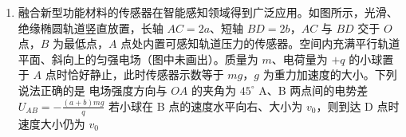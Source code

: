 \documentclass[\gkver]{gaokaozhenti}
\begin{document}
\begin{enumerate}
{可得波长 $\lambda = 4\Um$，故 B 正确；

A．结合 B 项分析可知 $x_{OM} = \frac{1}{2}\lambda = 2\Um$

所以该波的波速 $v = \frac{x_{OM}}{t} = 0.5\Ums$，故 A 错误；

C．从题图示状态经过 $2\Us$，则波沿 $x$ 轴正方向传播了 $\Delta x = 1\Um = \frac{\lambda}{4}$，故 $M$ 从平衡位置运动到了波峰位置，速度为 $0$，$N$ 从波谷位置运动到了平衡位置，速度最大，显然两点速度不同，故 C 错误；

D．该波的周期 $T = \frac{\lambda}{v} = 8\Us$

从图示时刻计时，$M$ 的振动方程为 $y_{M} = A\sin\frac{\pi}{4}t$

$N$ 的振动方程为 $y_{N} = A\sin\left(\frac{\pi}{4}t - \frac{\pi}{2}\right)$

经 $t = 3\Us$ 后，$y_{M} = y_{N} = \frac{\sqrt{2}}{2}A$，故 D 正确。

故选 BD。
}

\item
融合新型功能材料的传感器在智能感知领域得到广泛应用。如图所示，光滑、绝缘椭圆轨道竖直放置，长轴 $AC = 2a$、短轴 $BD = 2b$，$AC$ 与 $BD$ 交于 $O$ 点，$B$ 为最低点，$A$ 点处内置可感知轨道压力的传感器。空间内充满平行轨道平面、斜向上的匀强电场（图中未画出）。质量为 $m$、电荷量为 $+q$ 的小球置于 $A$ 点时恰好静止，此时传感器示数等于 $mg$，$g$ 为重力加速度的大小。下列说法正确的是 
\onepicture[w=8cm]{}
{电场强度方向与 $OA$ 的夹角为 $45^{\circ}$}
{A、B 两点间的电势差 $U_{AB} = -\frac{(a + b)mg}{q}$}
{若小球在 B 点的速度水平向右、大小为 $v_{0}$，则到达 D 点时速度大小仍为 $v_{0}$}
\end{enumerate}
\end{document}
